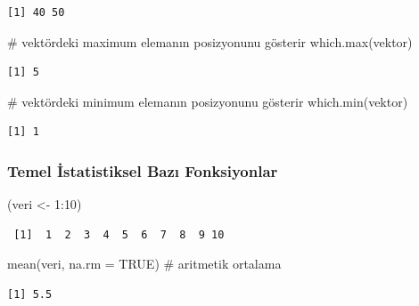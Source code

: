 \documentclass[
  letterpaper,
  DIV=11,
  numbers=noendperiod]{scrreprt}
\newenvironment{Shaded}{\begin{snugshade}}{\end{snugshade}}
\newcommand{\AttributeTok}[1]{\textcolor[rgb]{0.40,0.45,0.13}{#1}}
\newcommand{\CommentTok}[1]{\textcolor[rgb]{0.37,0.37,0.37}{#1}}
\newcommand{\ConstantTok}[1]{\textcolor[rgb]{0.56,0.35,0.01}{#1}}
\newcommand{\DecValTok}[1]{\textcolor[rgb]{0.68,0.00,0.00}{#1}}
\newcommand{\FunctionTok}[1]{\textcolor[rgb]{0.28,0.35,0.67}{#1}}
\newcommand{\NormalTok}[1]{\textcolor[rgb]{0.00,0.23,0.31}{#1}}
\newcommand{\OtherTok}[1]{\textcolor[rgb]{0.00,0.23,0.31}{#1}}
\newcommand{\SpecialCharTok}[1]{\textcolor[rgb]{0.37,0.37,0.37}{#1}}
\begin{document}
\begin{verbatim}
[1] 40 50
\end{verbatim}

\begin{Shaded}
\begin{Highlighting}[]
\CommentTok{\# vektördeki maximum elemanın posizyonunu gösterir}
\FunctionTok{which.max}\NormalTok{(vektor)}
\end{Highlighting}
\end{Shaded}

\begin{verbatim}
[1] 5
\end{verbatim}

\begin{Shaded}
\begin{Highlighting}[]
\CommentTok{\# vektördeki minimum elemanın posizyonunu gösterir}
\FunctionTok{which.min}\NormalTok{(vektor) }
\end{Highlighting}
\end{Shaded}

\begin{verbatim}
[1] 1
\end{verbatim}

\subsubsection{\texorpdfstring{\textbf{Temel İstatistiksel Bazı
Fonksiyonlar}}{Temel İstatistiksel Bazı Fonksiyonlar}}\label{temel-istatistiksel-bazux131-fonksiyonlar}

\begin{Shaded}
\begin{Highlighting}[]
\NormalTok{(veri }\OtherTok{\textless{}{-}} \DecValTok{1}\SpecialCharTok{:}\DecValTok{10}\NormalTok{)}
\end{Highlighting}
\end{Shaded}

\begin{verbatim}
 [1]  1  2  3  4  5  6  7  8  9 10
\end{verbatim}

\begin{Shaded}
\begin{Highlighting}[]
\FunctionTok{mean}\NormalTok{(veri, }\AttributeTok{na.rm =} \ConstantTok{TRUE}\NormalTok{) }\CommentTok{\# aritmetik ortalama}
\end{Highlighting}
\end{Shaded}

\begin{verbatim}
[1] 5.5
\end{verbatim}
\end{document}
